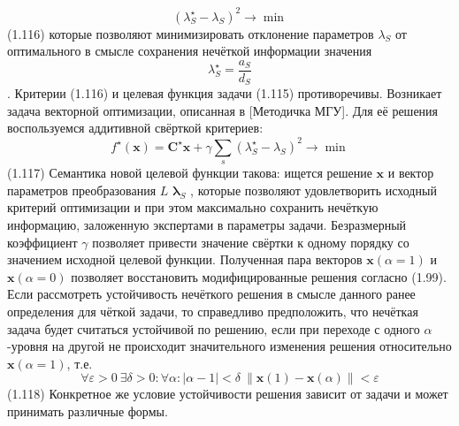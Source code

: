 	\[{{\left( \lambda _{S}^{\star}-{{\lambda }_{S}} \right)}^{2}}\to \min \] 	(1.116)
которые позволяют минимизировать отклонение параметров ${{\lambda }_{S}}$ от оптимального в смысле сохранения нечёткой информации значения \[\lambda _{S}^{\star}=\frac{{{a}_{S}}}{{{d}_{S}}}\]. Критерии (1.116) и целевая функция задачи (1.115) противоречивы. Возникает задача векторной оптимизации, описанная в [Методичка МГУ]. Для её решения воспользуемся аддитивной свёрткой критериев:
	\[{{f}^{\star}}\left( \mathbf{x} \right)={{\mathbf{C}}^{\star}}\mathbf{x}+\gamma \sum\limits_{s}^{{}}{{{\left( \lambda _{S}^{\star}-{{\lambda }_{S}} \right)}^{2}}\to \min }\] 	(1.117)
Семантика новой целевой функции такова: ищется решение $\mathbf{x}$ и вектор параметров преобразования $L$ ${{\mathbf{\lambda }}_{S}}$ , которые позволяют удовлетворить исходный критерий оптимизации и при этом максимально сохранить нечёткую информацию, заложенную экспертами в параметры задачи. Безразмерный коэффициент $\gamma$ позволяет привести значение свёртки к одному порядку со значением исходной целевой функции.
Полученная пара векторов $\mathbf{x}\left( \alpha =1 \right)$ и $\mathbf{x}\left( \alpha =0 \right)$ позволяет восстановить модифицированные решения согласно (1.99). Если рассмотреть устойчивость нечёткого решения в смысле данного ранее определения для чёткой задачи, то справедливо предположить, что нечёткая задача будет считаться устойчивой по решению, если при переходе с одного $\alpha$-уровня на другой не происходит значительного изменения решения относительно $\mathbf{x}\left( \alpha =1 \right)$, т.е.
	\[\forall \varepsilon >0\ \exists \delta >0:\forall \alpha :\left| \alpha -1 \right|<\delta \ \left\| \mathbf{x}\left( 1 \right)-\mathbf{x}\left( \alpha  \right) \right\|<\varepsilon \] 	(1.118)
Конкретное же условие устойчивости решения зависит от задачи и может принимать различные формы.